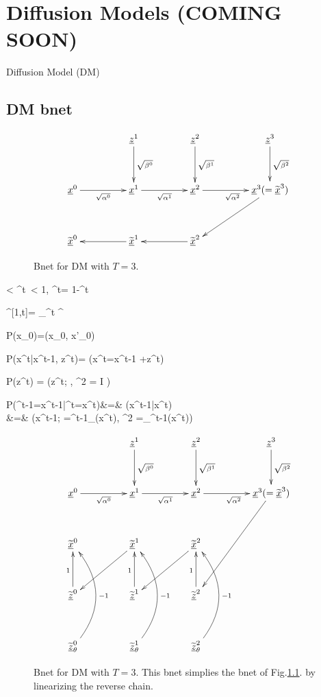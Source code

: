 \chapter{Diffusion Models (COMING SOON)}
\label{ch-diffusion}

Diffusion Model (DM)

\section{DM bnet}
\begin{figure}[h!]
$$
\xymatrix@C=4pc@R=3pc{
&\rvz^1\ar[d]^{\sqrt{\beta^0}}
&\rvz^2\ar[d]^{\sqrt{\beta^1}}
&\rvz^3\ar[d]^{\sqrt{\beta^2}}
\\
\rvx^0\ar[r]_{\sqrt{\alp^0}}
&\rvx^1\ar[r]_{\sqrt{\alp^1}}
&\rvx^2\ar[r]_{\sqrt{\alp^2}}
&\rvx^3(= \TIL{\rvx}^3)\ar[dl]
\\
\TIL{\rvx}^0
&\TIL{\rvx}^1\ar[l]
&\TIL{\rvx}^2\ar[l]
&
}
$$
\caption{Bnet for DM with $T=3$.}
\label{fig-diffusion1}
\end{figure}


< \alp^t\
< 1, \; \beta^t= 1-\alp^t
\eeq

\beq
\alp^{[1,t]}= \prod_{}^t \alp^\tau
\eeq

\beq \color{blue}
P(x_0)=\delta(x_0, x'_0)
\quad {}
\eeq

\beq \color{blue}
P(x^t|x^{t-1}, z^{t})=
\indi(\quad x^t=\;x^{t-1}
+\;z^{t}\quad)
\eeq

\beq \color{blue}
P(z^t) = \caln(z^t; ,
 \s^2 =  I )
\eeq

\beqa \color{blue}
P(\TIL{\rvx}^{t-1}=x^{t-1}|\TIL{\rvx}^{t}=x^{t})&=&\color{blue}
\tilPT(x^{t-1}|x^{t})
\\
&=&\color{blue}
\caln(x^{t-1}; \mu=\mu^{t-1}_\theta(x^t),
\s^2 =\Sigma_\theta^{t-1}(x^t))
 \eeqa
 
 \begin{figure}[h!]
 $$
 \xymatrix@C=4pc@R=3pc{
 &\rvz^1\ar[d]^{\sqrt{\beta^0}}
 &\rvz^2\ar[d]^{\sqrt{\beta^1}}
 &\rvz^3\ar[d]^{\sqrt{\beta^2}}
 \\
 \rvx^0\ar[r]_{\sqrt{\alp^0}}
 &\rvx^1\ar[r]_{\sqrt{\alp^1}}
 &\rvx^2\ar[r]_{\sqrt{\alp^2}}
 &\rvx^3(= \TIL{\rvx}^3)\ar[ddl]
 \\
 \TIL{\rvx}^0
 &\TIL{\rvx}^1\ar[dl]
 &\TIL{\rvx}^2\ar[dl]
 \\
 \TIL{\rvz}^0\ar[u]^{1}
 &\TIL{\rvz}^1\ar[u]^{1}
 &\TIL{\rvz}^2\ar[u]^{1}
 \\
 \TIL{\rvz}_\theta^0\ar@/_2pc/[uu]_{-1}
 &\TIL{\rvz}_\theta^1\ar@/_2pc/[uu]_{-1}
 &\TIL{\rvz}_\theta^2\ar@/_2pc/[uu]_{-1}
 }
 $$
 \caption{Bnet for DM with $T=3$.
 This bnet simplies
 the bnet of Fig.\ref{fig-diffusion1}.
 by linearizing the reverse chain.}
 \label{fig-diffusion2}
 \end{figure}
 
